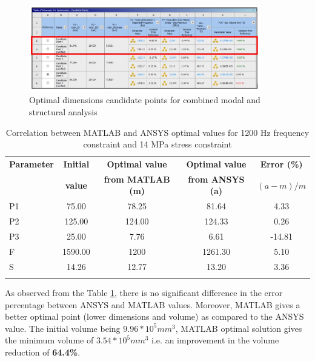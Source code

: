 \documentclass[12pt]{article}
\begin{document}
\begin{figure}[H]
\begin{center}
\includegraphics[width=0.9\textwidth]{ms.jpg}
\caption{Optimal dimensions candidate points for combined modal and structural analysis}
\label{ms}
\end{center}
\end{figure}
\begin{longtable}{|l|c|c|c|c|}
\hline 
\textbf{Parameter} & \textbf{Initial} & \textbf{Optimal value} & \textbf{Optimal value} & \textbf{Error (\%)} \\
 & \textbf{value} & \textbf{from MATLAB (m)} & \textbf{from ANSYS (a)} & \textbf{$(a-m)/m$}\\
\hline
P1 & 75.00 & 78.25 & 81.64 & 4.33 \\
\hline
P2 & 125.00 & 124.00 & 124.33 & 0.26 \\
\hline
P3 & 25.00 & 7.76 & 6.61 & -14.81\\
\hline
F & 1590.00 & 1200 & 1261.30 & 5.10 \\
\hline
S & 14.26  & 12.77 & 13.20 & 3.36 \\
\hline
\caption{Correlation between MATLAB and ANSYS optimal values for 1200 Hz frequency constraint and 14 MPa stress constraint}
\label{2con2}
\end{longtable}
\newpage
As observed from the Table \ref{2con2}, there is no significant difference in the error percentage between ANSYS and MATLAB values. Moreover, MATLAB gives a better optimal point (lower dimensions and volume) as compared to the ANSYS value. The initial volume being $9.96*10^{5} mm^{3}$, MATLAB optimal solution gives the minimum volume of $3.54*10^{5} mm^{3}$ i.e. an improvement in the volume reduction of \textbf{64.4\%}.
\end{document}
